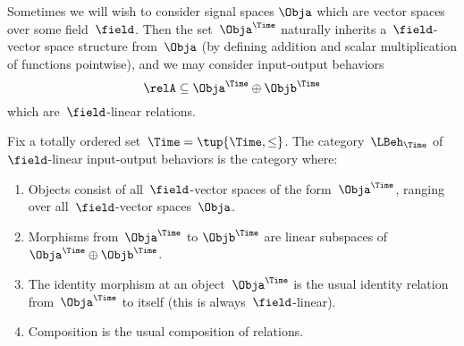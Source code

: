    Sometimes we will wish to consider signal spaces $\Obja$ which are vector spaces over some field~$\field$.
    Then the set~$\Obja^\Time$ naturally inherits a~$\field$-vector space structure from~$\Obja$ (by defining addition and scalar multiplication of functions pointwise), and we may consider input-output behaviors
    \begin{equation*}
        \relA \subseteq \Obja^\Time \oplus \Objb^\Time
    \end{equation*}
    which are~$\field$-linear relations.

    \begin{definition}
        Fix a totally ordered set~$\Time = \tup{\Time, \leq}$.
        The category~$\LBeh_\Time$ of~$\field$-linear input-output behaviors is the category where:
        \begin{enumerate}
            \item Objects consist of all~$\field$-vector spaces of the form~$\Obja^\Time$, ranging over all~$\field$-vector spaces~$\Obja$.
            \item Morphisms from~$\Obja^\Time$ to $\Objb^\Time$ are linear subspaces of~$\Obja^\Time \oplus \Objb^\Time$.
            \item The identity morphism at an object~$\Obja^\Time$ is the usual identity relation from~$\Obja^\Time$ to itself (this is always~$\field$-linear).
            \item Composition is the usual composition of relations.
        \end{enumerate}
    \end{definition}
    

